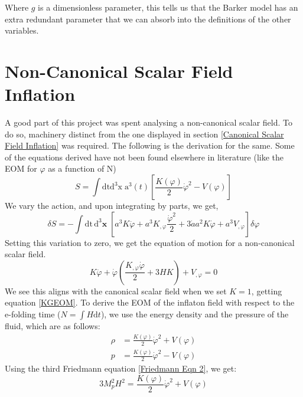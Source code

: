 \documentclass[aps,prd,reprint,preprintnumbers,showpacs,floatfix,nofootinbib,superscript address]{revtex4-2}
\begin{document}
Where $g$ is a dimensionless parameter, this tells us that the Barker model has an extra redundant parameter that we can absorb into the definitions of the other variables.
\section{Non-Canonical Scalar Field Inflation} \label{Non-Canonical Scalar Field Inflation}

A good part of this project was spent analysing a non-canonical scalar field. To do so, machinery distinct from the one displayed in section \cref{Canonical Scalar Field Inflation} was required. The following is the derivation for the same. Some of the equations derived have not been found elsewhere in literature (like the EOM for $\varphi$ as a function of N)
\begin{equation} \label{13}
    S = \int \text{dt}\text{d}^3\text{x} \; \text{a}^3(t) \left[ \frac{K(\varphi)}{2}\dot{\varphi}^2 - V(\varphi) \right]
\end{equation}
We vary the action, and upon integrating by parts, we get,
\begin{equation}
    \delta S = - \int \text{dt}\,\text{d}^3\textbf{x} \; \left[ a^3 K \ddot{\varphi} + a^3K_{,\varphi} \frac{\dot{\varphi}^2}{2}  +  3\dot{a} a^2 K \dot{\varphi} + a^3V_{,\varphi}  \right]\delta \varphi
\end{equation}
Setting this variation to zero, we get the equation of motion for a non-canonical scalar field.
\begin{equation} \label{16}
    K \ddot{\varphi} + \dot{\varphi} \left(\frac{K_{,\varphi} \dot{\varphi}}{2} + 3H K \right) + V_{,\varphi}   = 0
\end{equation}
We see this aligns with the canonical scalar field when we set $K = 1$, getting equation \cref{KGEOM}. To derive the EOM of the inflaton field with respect to the e-folding time ($N = \int H \text{d}t$), we use the energy density and the pressure of the fluid, which are as follows: 
\begin{align}   \label{18}
    \rho &= \frac{K(\varphi)}{2} \dot{\varphi}^2 + V(\varphi) \nonumber \\
    p &= \frac{K(\varphi)}{2} \dot{\varphi}^2 - V(\varphi)
\end{align}
Using the third Friedmann equation \cref{Friedmann Eqn 2}, we get:
\begin{equation}    \label{19}
    3 M_p^2H^2 = \frac{K(\varphi)}{2} \dot{\varphi}^2 + V(\varphi)
\end{equation}
\end{document}
